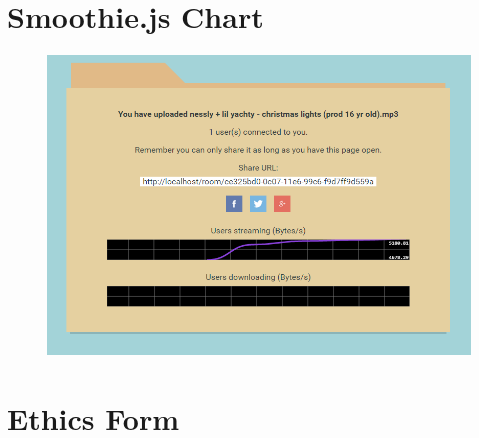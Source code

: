 \documentclass[]{report}
\begin{document}
	\chapter{Smoothie.js Chart}
	\begin{figure}[H]
		\centering
		\includegraphics[scale=0.7]{smoothie-js.png}
	\end{figure}
	
	\chapter{Ethics Form}
			
\end{document}
